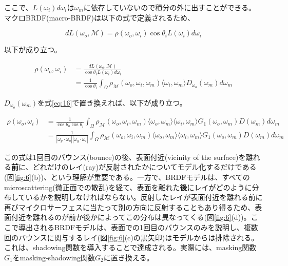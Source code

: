 \documentclass[a4j,xelatex,ja=standard]{bxjsarticle}
\begin{document}
ここで、$L(\omega_i)d\omega_i$は$\omega_m$に依存していないので積分の外に出すことができる。
マクロBRDF(macro-BRDF)は以下の式で定義されるため、

\begin{equation}
    dL(\omega_o, \mathcal{M}) = \rho(\omega_o, \omega_i) \cos\theta_i L(\omega_i) d\omega_i
    \label{eq:23}
\end{equation}

以下が成り立つ。

\begin{equation}
    \begin{split}
        \rho(\omega_o, \omega_i)
        &= \frac{dL(\omega_o, \mathcal M)}{\cos\theta_i L(\omega_i) d\omega_i} \\
        &= \frac{1}{\cos\theta_i} \int_{\Omega} \rho_{\mathcal M}(\omega_o, \omega_i, \omega_m) \langle \omega_i, \omega_m \rangle D_{\omega_o}(\omega_m) d\omega_m
    \end{split}
    \label{eq:24}
\end{equation}

$D_{\omega_o}(\omega_m)$を式\eqref{eq:16}で置き換えれば、以下が成り立つ。

\begin{equation}
    \begin{split}
        \rho(\omega_o, \omega_i)
        &= \frac{1}{\cos\theta_o \cos\theta_i} \int_{\Omega} \rho_{\mathcal M}(\omega_o, \omega_i, \omega_m) \langle \omega_o, \omega_m \rangle \langle \omega_i, \omega_m \rangle G_1(\omega_o, \omega_m) D(\omega_m) d\omega_m \\
        &= \frac{1}{|\omega_g \cdot \omega_o| |\omega_g \cdot \omega_i|} \int_{\Omega} \rho_{\mathcal M}(\omega_o, \omega_i, \omega_m) \langle \omega_o, \omega_m \rangle \langle \omega_i, \omega_m \rangle G_1(\omega_o, \omega_m) D(\omega_m) d\omega_m
    \end{split}
    \label{eq:25}
\end{equation}

この式は1回目のバウンス(bounce)の後、表面付近(vicinity of the surface)を離れる\textbf{前}に、どれだけのレイ(ray)が反射されたかについてモデル化するだけである(図\ref{fig:6}(b))、という理解が重要である。一方で、BRDFモデルは、すべてのmicroscattering(微正面での散乱)を経て、表面を離れた\textbf{後}にレイがどのように分布しているかを説明しなければならない。反射したレイが表面付近を離れる前に再びマイクロサーフェスに当たって別の方向に反射することもあり得るため、表面付近を離れるのが前か後かによってこの分布は異なってくる(図\ref{fig:6}(d))。ここで導出されるBRDFモデルは、表面での1回目のバウンスのみを説明し、複数回のバウンスに関与するレイ(図\ref{fig:6}(c)の黒矢印)はモデルからは排除される。これは、shadowing関数を導入することで達成される。実際には、masking関数$G_1$をmasking-shadowing関数$G_2$に置き換える。
\end{document}
